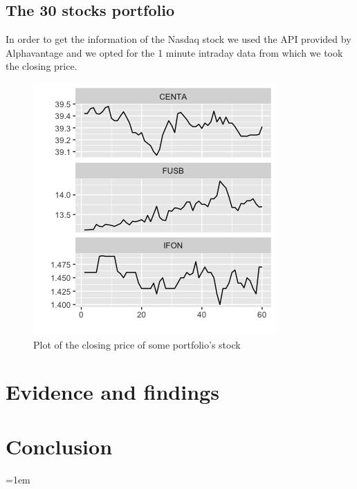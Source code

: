 \documentclass[twocolumn]{article}
\begin{document}
\subsection{The 30 stocks portfolio}
In order to get the information of the Nasdaq stock we used the API provided by Alphavantage \cite{_alpha_} and we opted for the 1 minute intraday data from which we took the closing price.
\begin{figure}
    \centering
    \includegraphics[width=1\linewidth, ]{Paper/images/Rplot.png}
    \caption{Plot of the closing price of some portfolio's stock}
    \label{portfolo}
\end{figure}

\section{Evidence and findings}

\section{Conclusion}

\newpage
\emergencystretch=1em
\sloppy
\printbibliography
\end{document}
